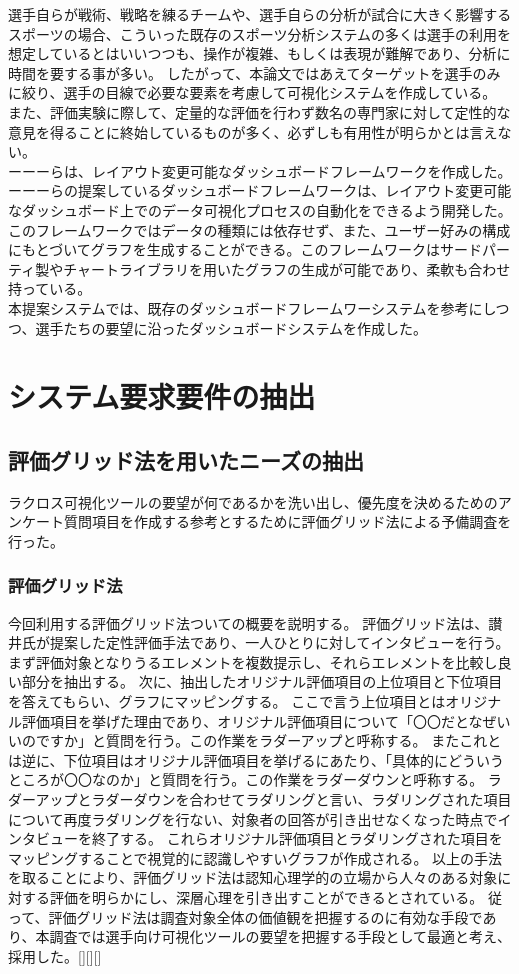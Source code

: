 \documentclass[sotsuron]{kuee}
\begin{document}
選手自らが戦術、戦略を練るチームや、選手自らの分析が試合に大きく影響するスポーツの場合、こういった既存のスポーツ分析システムの多くは選手の利用を想定しているとはいいつつも、操作が複雑、もしくは表現が難解であり、分析に時間を要する事が多い。
したがって、本論文ではあえてターゲットを選手のみに絞り、選手の目線で必要な要素を考慮して可視化システムを作成している。
また、評価実験に際して、定量的な評価を行わず数名の専門家に対して定性的な意見を得ることに終始しているものが多く、必ずしも有用性が明らかとは言えない。
\\ーーーらは、レイアウト変更可能なダッシュボードフレームワークを作成した。ーーーらの提案しているダッシュボードフレームワークは、レイアウト変更可能なダッシュボード上でのデータ可視化プロセスの自動化をできるよう開発した。このフレームワークではデータの種類には依存せず、また、ユーザー好みの構成にもとづいてグラフを生成することができる。このフレームワークはサードパーティ製やチャートライブラリを用いたグラフの生成が可能であり、柔軟も合わせ持っている。
\\本提案システムでは、既存のダッシュボードフレームワーシステムを参考にしつつ、選手たちの要望に沿ったダッシュボードシステムを作成した。

\chapter{システム要求要件の抽出}
\section{評価グリッド法を用いたニーズの抽出}
ラクロス可視化ツールの要望が何であるかを洗い出し、優先度を決めるためのアンケート質問項目を作成する参考とするために評価グリッド法による予備調査を行った。
\subsection{評価グリッド法}
今回利用する評価グリッド法ついての概要を説明する。
評価グリッド法は、讃井氏が提案した定性評価手法であり、一人ひとりに対してインタビューを行う。
まず評価対象となりうるエレメントを複数提示し、それらエレメントを比較し良い部分を抽出する。
次に、抽出したオリジナル評価項目の上位項目と下位項目を答えてもらい、グラフにマッピングする。
ここで言う上位項目とはオリジナル評価項目を挙げた理由であり、オリジナル評価項目について「〇〇だとなぜいいのですか」と質問を行う。この作業をラダーアップと呼称する。
またこれとは逆に、下位項目はオリジナル評価項目を挙げるにあたり、「具体的にどういうところが〇〇なのか」と質問を行う。この作業をラダーダウンと呼称する。
ラダーアップとラダーダウンを合わせてラダリングと言い、ラダリングされた項目について再度ラダリングを行ない、対象者の回答が引き出せなくなった時点でインタビューを終了する。
これらオリジナル評価項目とラダリングされた項目をマッピングすることで視覚的に認識しやすいグラフが作成される。
以上の手法を取ることにより、評価グリッド法は認知心理学的の立場から人々のある対象に対する評価を明らかにし、深層心理を引き出すことができるとされている。
従って、評価グリッド法は調査対象全体の価値観を把握するのに有効な手段であり、本調査では選手向け可視化ツールの要望を把握する手段として最適と考え、採用した。[][][]
\end{document}
